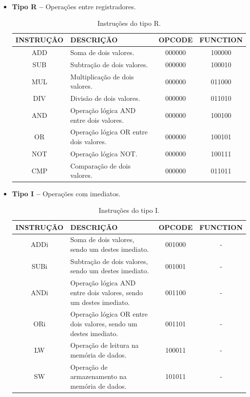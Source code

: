 \documentclass{report}
\begin{document}
  \begin{itemize}
    \item \textbf{Tipo R --} Operações entre registradores.
    
	\begin{table}[H]
	\centering
	\begin{tabular}{|c|m{6cm}|c|c|}
  	\hline 
  	\textbf{INSTRUÇÃO} & \textbf{DESCRIÇÃO} & \textbf{OPCODE} & \textbf{FUNCTION} \\ 
  	\hline   	
  	ADD & Soma de dois valores. & 000000 & 100000 \\ \hline
  	SUB & Subtração de dois valores. & 000000 & 100010 \\ \hline
  	MUL & Multiplicação de dois valores. & 000000 & 011000 \\ \hline
  	DIV & Divisão de dois valores. & 000000 & 011010 \\ \hline
  	AND & Operação lógica AND entre dois valores. & 000000 & 100100 \\ \hline
  	OR & Operação lógica OR entre dois valores. & 000000 & 100101 \\ \hline
  	NOT & Operação lógica NOT. & 000000 & 100111 \\ \hline
  	CMP & Comparação de dois valores. & 000000 & 011011 \\ \hline
  	\end{tabular} 
  	\caption{Instruções do tipo R.}
  \end{table}    

    \item \textbf{Tipo I --} Operações com imediatos.
    
	\begin{table}[H]
	\centering
	\begin{tabular}{|c|m{6cm}|c|c|}
  	\hline 
  	\textbf{INSTRUÇÃO} & \textbf{DESCRIÇÃO} & \textbf{OPCODE} & \textbf{FUNCTION} \\ 
  	\hline 
  	ADDi &  Soma de dois valores, sendo um destes imediato. & 001000 & - \\ \hline
  	SUBi & Subtração de dois valores, sendo um destes imediato. & 001001 & - \\ \hline
  	ANDi & Operação lógica AND entre dois valores, sendo um destes imediato. & 001100 & - \\ \hline
  	ORi & Operação lógica OR entre dois valores, sendo um destes imediato. & 001101 & - \\ \hline
    LW & Operação de leitura na memória de dados. & 100011 & - \\ \hline
    SW & Operação de armazenamento na memória de dados. & 101011 & - \\ \hline
  	\end{tabular} 
  	\caption{Instruções do tipo I.}
  \end{table}
    

\end{itemize}
\end{document}

